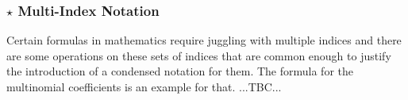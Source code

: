 









\subsubsection{$\star$ Multi-Index Notation}
Certain formulas in mathematics require juggling with multiple indices and there are some operations on these sets of indices that are common enough to justify the introduction of a condensed notation for them. The formula for the multinomial coefficients is an example for that. ...TBC...






